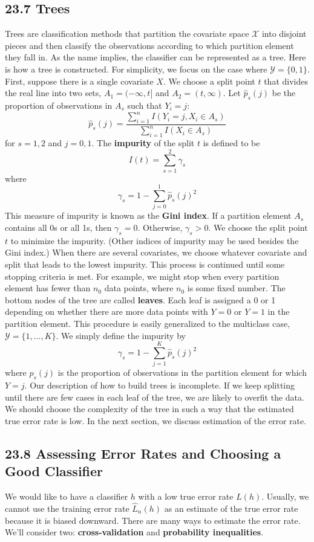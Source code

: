 \subsection*{23.7 Trees}\label{trees}
Trees are classification methods that partition the covariate space
\(\mathcal{X}\) into disjoint pieces and then classify the observations
according to which partition element they fall in. As the name implies,
the classifier can be represented as a tree.
Here is how a tree is constructed. For simplicity, we focus on the case
where \(\mathcal{Y} = \{ 0, 1 \}\). First, suppose there is a single
covariate \(X\). We choose a split point \(t\) that divides the real
line into two sets, \(A_{1} = (-\infty, t]\) and \(A_{2} = (t, \infty)\).
Let \(\hat{p}_s(j)\) be the proportion of observations in \(A_s\) such
that \(Y_{i} = j\):
\[
\hat{p}_s(j) = \frac{\sum_{i=1}^{n} I(Y_{i} = j, X_{i} \in A_s)}{\sum_{i=1}^{n} I(X_{i} \in A_s)}
\]
for \(s = 1, 2\) and \(j = 0, 1\). The \textbf{impurity} of the split
\(t\) is defined to be
\[
I(t) = \sum_{s=1}^{2} \gamma_s
\]
where
\[
\gamma_s = 1 - \sum_{j=0}^{1} \hat{p}_s(j)^{2}
\]
This measure of impurity is known as the \textbf{Gini index}. If a
partition element \(A_s\) contains all 0s or all 1s, then
\(\gamma_s = 0\). Otherwise, \(\gamma_s > 0\). We choose the split point
\(t\) to minimize the impurity. (Other indices of impurity may be used
besides the Gini index.)
When there are several covariates, we choose whatever covariate and
split that leads to the lowest impurity. This process is continued until
some stopping criteria is met. For example, we might stop when every
partition element has fewer than \(n_{0}\) data points, where \(n_{0}\) is
some fixed number. The bottom nodes of the tree are called
\textbf{leaves}. Each leaf is assigned a 0 or 1 depending on whether
there are more data points with \(Y = 0\) or \(Y = 1\) in the partition
element.
This procedure is easily generalized to the multiclass case,
\(\mathcal{Y} = \{ 1, \dots, K \}\). We simply define the impurity by
\[
\gamma_s = 1 - \sum_{j=1}^K \hat{p}_s(j)^{2}
\]
where \(\hat{p}_s(j)\) is the proportion of observations in the
partition element for which \(Y = j\).
Our description of how to build trees is incomplete. If we keep
splitting until there are few cases in each leaf of the tree, we are
likely to overfit the data. We should choose the complexity of the tree
in such a way that the estimated true error rate is low. In the next
section, we discuss estimation of the error rate.

\subsection*{23.8 Assessing Error Rates and Choosing a Good Classifier}\label{assessing-error-rates-and-choosing-a-good-classifier}
We would like to have a classifier \(h\) with a low true error rate
\(L(h)\). Usually, we cannot use the training error rate \(\hat{L}_{n}(h)\)
as an estimate of the true error rate because it is biased downward.
There are many ways to estimate the error rate. We'll consider two:
\textbf{cross-validation} and \textbf{probability inequalities}.
